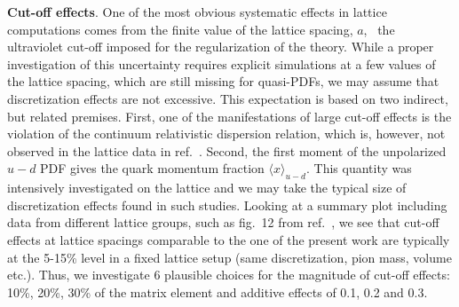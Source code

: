\textbf{Cut-off effects}. One of the most obvious systematic effects in lattice
computations comes from the finite value of the lattice spacing, $a$, \ie\ the
ultraviolet cut-off imposed for the regularization of the theory. While a proper
investigation of this uncertainty requires explicit simulations at a few values
of the lattice spacing, which are still missing for quasi-PDFs, we may assume
that discretization effects are not excessive. This expectation is based on two
indirect, but related premises. First, one of the manifestations of large
cut-off effects is the violation of the continuum relativistic dispersion
relation, which is, however, not observed in the lattice data in
ref.~\cite{Alexandrou:2019lfo}. Second, the first moment of the unpolarized
$u-d$ PDF gives the quark momentum fraction $\langle x\rangle_{u-d}$. This
quantity was intensively investigated on the lattice and we may take the typical
size of discretization effects found in such studies. Looking at a summary plot
including data from different lattice groups, such as fig.\ 12 from ref.\
\cite{Constantinou:2014tga}, we see that cut-off effects at lattice spacings
comparable to the one of the present work are typically at the 5-15\% level in a
fixed lattice setup (same discretization, pion mass, volume etc.). Thus, we
investigate 6 plausible choices for the magnitude of cut-off effects: 10\%,
20\%, 30\% of the matrix element and additive effects of 0.1, 0.2 and 0.3. 

